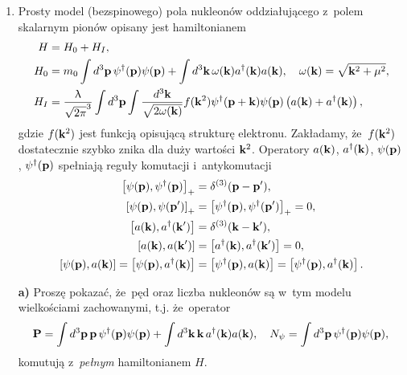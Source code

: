 \documentclass[a4paper,11pt]{article}
\begin{document}
\begin{enumerate}
\item Prosty model (bezspinowego) pola nukleonów oddziałującego
  z~polem skalarnym pionów opisany jest hamiltonianem
  \begin{align}
    H &= H_{ 0 } + H_{ I }, \\
    H_{ 0 }
      &=
        m_{ 0 } \int d^{ 3 }\mathbf{p} \, \psi^{ \dagger }( \mathbf{p} )
        \psi( \mathbf{p} )
        + \int d^{ 3 } \mathbf{k} \, \omega( \mathbf{k} ) a^{ \dagger }( \mathbf{k} )
        a( \mathbf{k} ),
        \quad
        \omega( \mathbf{k} ) = \sqrt{ \mathbf{k}^{ 2 } + \mu^{ 2 } }, \\
    H_{ I }
      &=
        \frac{ \uplambda }{ \sqrt{ 2\pi }^{ 3 } }
        \int d^{ 3 } \mathbf{p}
        \int \frac{ d^{ 3 } \mathbf{k} }{ \sqrt{ 2\omega( \mathbf{k} ) } }
        f( \mathbf{k}^{ 2 } ) \psi^{ \dagger }( \mathbf{p} + \mathbf{k} )
        \psi( \mathbf{p} )
        \left( a( \mathbf{k} ) + a^{ \dagger }( \mathbf{k} ) \right),
  \end{align}
  gdzie $f( \mathbf{k}^{ 2 } )$ jest funkcją opisującą strukturę
  elektronu. Zakładamy, że~$f( \mathbf{k}^{ 2 } )$ dostatecznie szybko
  znika dla duży wartości $\mathbf{k}^{ 2 }$. Operatory
  $a( \mathbf{k} )$, $a^{ \dagger }( \mathbf{k} )$, $\psi( \mathbf{p} )$,
  $\psi^{ \dagger }( \mathbf{p} )$ spełniają reguły komutacji i~antykomutacji
  \begin{align}
    \left[ \psi( \mathbf{p} ), \psi^{ \dagger }( \mathbf{p} ) \right]_{ + }
    &= \delta^{ ( 3 ) }( \mathbf{p} - \mathbf{p}' ), \\
    \left[ \psi( \mathbf{p} ), \psi( \mathbf{p}' ) \right]_{ + }
    &=
      \left[ \psi^{ \dagger }( \mathbf{p} ), \psi^{ \dagger }( \mathbf{p}' ) \right]_{ + }
      = 0, \\
    \left[ a( \mathbf{k} ), a^{ \dagger }( \mathbf{k}' ) \right]
    &= \delta^{ ( 3 ) }( \mathbf{k} - \mathbf{k}' ), \\
    \left[ a( \mathbf{k}), a( \mathbf{k}' ) \right]
    &=
      \left[ a^{ \dagger }( \mathbf{k} ), a^{ \dagger }( \mathbf{k}' ) \right] = 0, \\
    \left[ \psi( \mathbf{p} ), a( \mathbf{k} ) \right]
    = \left[ \psi( \mathbf{p} ), a^{ \dagger }( \mathbf{k} ) \right]
    &=
      \left[ \psi^{ \dagger }( \mathbf{p} ), a( \mathbf{k} ) \right]
      = \left[ \psi^{ \dagger }( \mathbf{p} ), a^{ \dagger }( \mathbf{k} ) \right].
  \end{align}

  \textbf{a)} Proszę pokazać, że~pęd oraz liczba nukleonów są w~tym
  modelu wielkościami zachowanymi, t.j. że~operator
  \begin{equation}
    \mathbf{P}
    =
    \int d^{ 3 } \mathbf{p} \, \mathbf{p} \, \psi^{ \dagger }( \mathbf{p} )
    \psi( \mathbf{p} )
    + \int d^{ 3 } \mathbf{k} \, \mathbf{k} \, a^{ \dagger }( \mathbf{k} )
    a( \mathbf{k} ), \quad
    N_{ \psi } = \int d^{ 3 } \mathbf{p} \, \psi^{ \dagger }( \mathbf{p} ) \psi( \mathbf{p} ),
  \end{equation}
  komutują z~\textit{pełnym} hamiltonianem $H$.


\end{enumerate}
\end{document}
